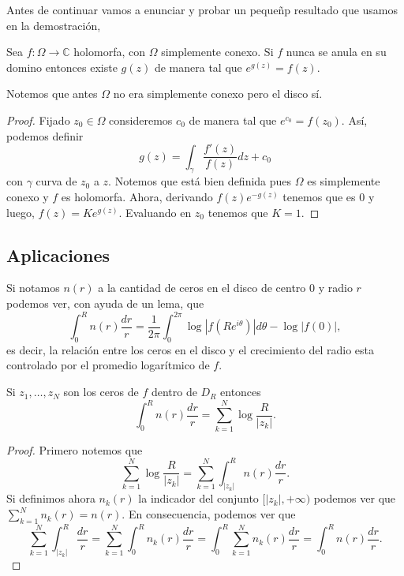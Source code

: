 \documentclass[
]{kaohandt}
\newcommand{\C}{\mathbb{C}}
\begin{document}
	Antes de continuar vamos a enunciar y probar un pequeñp resultado que usamos en la demostración,
	
	\begin{proposition}
		Sea $f: \Omega \to \C$ holomorfa, con $\Omega$ simplemente conexo. Si $f$ nunca se anula en su domino entonces existe $g(z)$ de manera tal que $e^{g(z)} = f(z).$ 
	\end{proposition}
	
	\begin{remark}
		Notemos que antes $\Omega$ no era simplemente conexo pero el disco sí.
	\end{remark}
	
	\begin{proof}
		Fijado $z_0 \in \Omega$ consideremos $c_0$ de manera tal que $e^{c_0} = f(z_0)$. Así, podemos definir
		$$ g(z) = \int_{\gamma} \frac{f'(z)}{f(z)}dz + c_0$$
		con $\gamma$ curva de $z_0$ a $z$. Notemos que está bien definida pues $\Omega$ es simplemente conexo y $f$ es holomorfa. Ahora, derivando $f(z)e^{-g(z)}$ tenemos que es $0$ y luego,
		$f(z) = Ke^{g(z)}.$ Evaluando en $z_0$ tenemos que $K = 1$.
	\end{proof}
	
	\subsection{Aplicaciones}
	
	Si notamos $n(r)$ a la cantidad de ceros en el disco de centro $0$ y radio $r$ podemos ver, con ayuda de un lema, que
	$$\int_{0}^{R}n(r)\frac{dr}{r} = \frac{1}{2\pi} \int_{0}^{2\pi} \log{|f(Re^{i\theta})|}d\theta - \log{|f(0)|},$$
	es decir, la relación entre los ceros en el disco y el crecimiento del radio esta controlado por el promedio logarítmico de $f$.
	
	\begin{lemma}
		Si $z_1, \dots,z_N$ son los ceros de $f$ dentro de $D_R$ entonces
		$$\int_{0}^{R}n(r)\frac{dr}{r} = \sum_{k=1}^{N} \log{\frac{R}{|z_k|}}.$$
	\end{lemma}
	
	\begin{proof}
		Primero notemos que
		$$\sum_{k=1}^{N} \log{\frac{R}{|z_k|}} = \sum_{k=1}^{N} \int_{|z_k|}^{R}n(r)\frac{dr}{r}.$$
		Si definimos ahora $n_k(r)$ la indicador del conjunto $[|z_k|, +\infty)$ podemos ver que $\sum_{k=1}^{N} n_k(r) = n(r).$ En consecuencia, podemos ver que
		$$\sum_{k=1}^{N}\int_{|z_k|}^{R} \frac{dr}{r} = \sum_{k=1}^{N}\int_{0}^{R} n_k(r)\frac{dr}{r} = \int_{0}^{R} \sum_{k=1}^{N} n_k(r)\frac{dr}{r} = \int_{0}^{R} n(r)\frac{dr}{r}.$$
	\end{proof}
	
\end{document}
